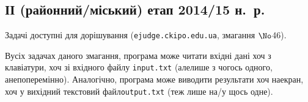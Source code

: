\renewenvironment{problemAllDefault}[1]{\vspace{10mm}\par\begin{problem}{#1}{\stdinOrInputTxt}{\stdoutOrOutputTxt}{1 сек}{64 мегабайти}}{\end{problem}}

\subsection{ІІ (районний/міський) етап 2014/15 н.~р.}

Задачі доступні для дорішування (\verb"ejudge.ckipo.edu.ua", змагання $\No$46).

В\nolinebreak[3] усіх задачах даного змагання, програма може читати вхідні дані хоч з клавіатури, хоч зі вхідного файлу \verb"input.txt" (але\nolinebreak[2] лише з чогось одного, а\nolinebreak[3] не\nolinebreak[2] поперемінно). Аналогічно, програма може виводити результати хоч на\nolinebreak[3] екран, хоч у вихідний текстовий файл\nolinebreak[2] \verb"output.txt" (теж лише на/у щось одне).


\vspace{-0.5\baselineskip minus 1cm}
	

	

	

	


